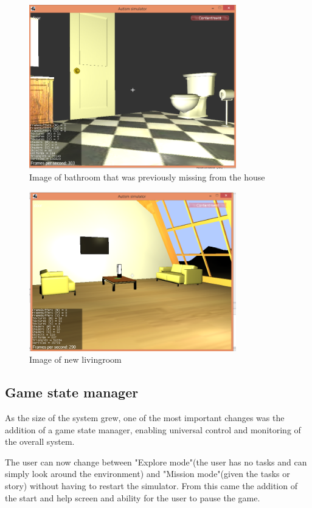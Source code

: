 \documentclass[11pt]{report}
\begin{document}
\begin{figure}[H]
\centering
\includegraphics[width=90mm]{images/new_bathroom.png}
\caption{Image of bathroom that was previously missing from the house}
\label{old_house}
\end{figure}

\begin{figure}[H]
\centering
\includegraphics[width=90mm]{images/new_livingroom.png}
\caption{Image of new livingroom}
\label{old_house}
\end{figure}

\subsection{Game state manager}

As the size of the system grew, one of the most important changes was the addition of a game state manager, enabling universal control and monitoring of the overall system. 

The user can now change between "Explore mode"(the user has no tasks and can simply look around the environment) and "Mission mode"(given the tasks or story) without having to restart the simulator. From this came the addition of the start and help screen and ability for the user to pause the game.  
\end{document}
